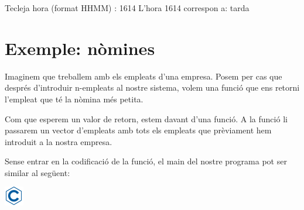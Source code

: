 \documentclass[]{book}
\newenvironment{Shaded}{\begin{snugshade}}{\end{snugshade}}
\newcommand{\DecValTok}[1]{\textcolor[rgb]{0.00,0.00,0.81}{#1}}
\newcommand{\NormalTok}[1]{#1}
\begin{document}
\begin{Shaded}
\begin{Highlighting}[]
\NormalTok{Tecleja hora (format HHMM) : }\DecValTok{1614}
\NormalTok{L'hora }\DecValTok{1614}\NormalTok{ correspon a: tarda}
\end{Highlighting}
\end{Shaded}

\section{Exemple: nòmines}\label{exemple-nomines-1}

Imaginem que treballem amb els empleats d'una empresa. Posem per cas que
després d'introduir n-empleats al nostre sistema, volem una funció que
ens retorni l'empleat que té la nòmina més petita.

Com que esperem un valor de retorn, estem davant d'una funció. A la
funció li passarem un vector d'empleats amb tots els empleats que
prèviament hem introduit a la nostra empresa.

Sense entrar en la codificació de la funció, el main del nostre programa
pot ser similar al següent:

\includegraphics{./img/c.png}
\end{document}
